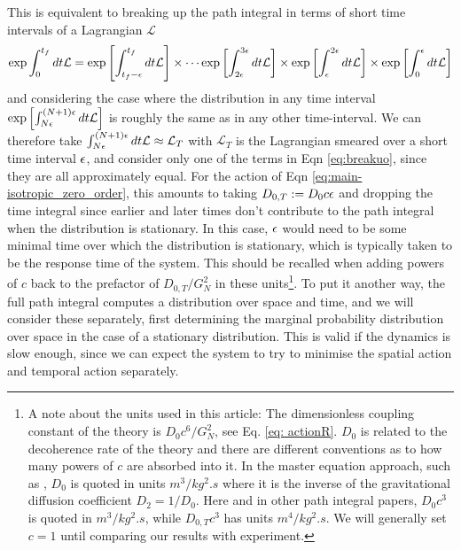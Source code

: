 \documentclass[aps,pra,amsmath,amssymb,amsthm,floatfix,nofootinbib,notitlepage,superscriptaddress,10pt]{revtex4-2}
\begin{document}
This is equivalent to breaking up the path integral in terms of short time intervals of a Lagrangian $\mathcal{L}$ 
\begin{align}
\exp{\int_0^{t_f} dt \mathcal{L} }=\exp\left[{\int_{t_f-\epsilon}^{t_f} dt \mathcal{L} }\right]\times \cdots \exp{\left[\int_{2\epsilon}^{3\epsilon} dt \mathcal{L} \right]}\times\exp{\left[\int_{\epsilon}^{2\epsilon} dt \mathcal{L}\right] } \times\exp{\left[\int_0^{\epsilon} dt  \mathcal{L}\right] }
\label{eq:breakuo}
\end{align}
and considering the case where the distribution in any time interval $\exp{\left[\int_{N\epsilon}^{(N+1)\epsilon} dt \mathcal{L} \right] }$ is roughly the same as in any other time-interval. We can therefore take $\int_{N\epsilon}^{(N+1)\epsilon}dt \mathcal{L}\approx  \mathcal{L}_T$ with $\mathcal{L}_T$ is the Lagrangian smeared over a short time interval $\epsilon$, and consider only one of the terms in Eqn \eqref{eq:breakuo}, since they are all approximately equal. For the action of Eqn \eqref{eq:main-isotropic_zero_order}, this amounts to taking $D_{0,T}:=D_0c\epsilon$ and dropping the time integral since earlier and later times don't contribute to the path integral when the distribution is stationary.  In this case, $\epsilon$ would need to be some minimal time over which the distribution is stationary, which is typically taken to be the response time of the system. This should be recalled when adding powers of $c$ back to the prefactor of $D_{0,T}/G_N^2$ in these units\footnote{A note about the units used in this article: The dimensionless coupling constant of the theory is $D_0 c^6/G_N^2$, see Eq. \eqref{eq: actionR}. $D_0$ is related to the decoherence rate of the theory and there are different conventions as to how many powers of $c$ are absorbed into it. In the master equation approach, such as \cite{oppenheim2023gravitationally}, $D_0$ is quoted in units $\unit{m^3/kg^2.s}$ where it is the inverse of the gravitational diffusion coefficient $D_2=1/D_0$. Here and in other path integral papers, $D_0 c^3$ is quoted in $\unit{m^3/kg^2.s}$, while $D_{0,T} c^3$ has units $\unit{m^4/kg^2.s}$. We will generally set $c=1$ until comparing our results with experiment.}. To put it another way, the full path integral computes a distribution over space and time, and we will consider these separately, first determining the marginal probability distribution over space in the case of a stationary distribution. This is valid if the dynamics is slow enough, since we can expect the system to try to minimise the spatial action and temporal action separately.
\end{document}
